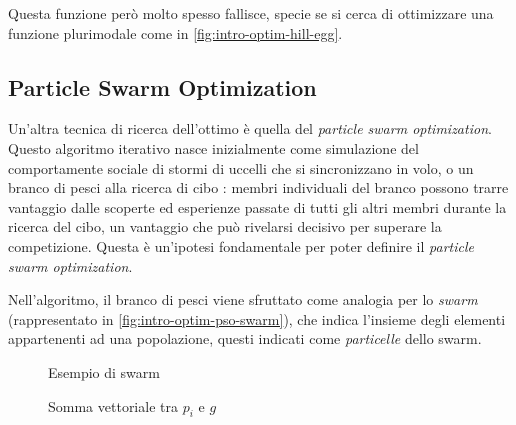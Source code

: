 Questa funzione però molto spesso fallisce, specie se si cerca di ottimizzare una funzione plurimodale come in \autoref{fig:intro-optim-hill-egg}.

\subsection{Particle Swarm Optimization}
\label{chap:intro-optim-pso}
Un'altra tecnica di ricerca dell'ottimo è quella del \textit{particle swarm optimization}. Questo algoritmo iterativo nasce inizialmente come simulazione del comportamente sociale di stormi di uccelli che si sincronizzano in volo, o un branco di pesci alla ricerca di cibo \cite{pso}: membri individuali del branco possono trarre vantaggio dalle scoperte ed esperienze passate di tutti gli altri membri durante la ricerca del cibo, un vantaggio che può rivelarsi decisivo per superare la competizione. Questa è un'ipotesi fondamentale per poter definire il \textit{particle swarm optimization}.

Nell'algoritmo, il branco di pesci viene sfruttato come analogia per lo \textit{swarm} (rappresentato in \autoref{fig:intro-optim-pso-swarm}), che indica l'insieme degli elementi appartenenti ad una popolazione, questi indicati come \textit{particelle} dello swarm.

\begin{figure}[!h]
    \begin{minipage}{0.5 \textwidth}
        \centering
        \caption{\small Esempio di swarm}
        \label{fig:intro-optim-pso-swarm}
    \end{minipage}
    \begin{minipage}{0.5 \textwidth}
        \centering
        \caption{\small Somma vettoriale tra $p_i$ e $g$}
        \label{fig:intro-optim-pso-sum}
    \end{minipage}
\end{figure}

